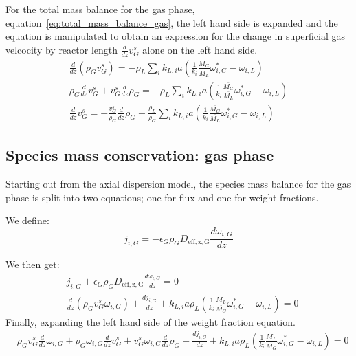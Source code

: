 \documentclass{article}
\begin{document}
For the total mass balance for the gas phase, equation~\ref{eq:total_mass_balance_gas}, the left hand side is expanded and the equation is manipulated to obtain an expression for the change in superficial gas velcocity by reactor length $\frac{d}{dz}v_G^s$ alone on the left hand side.
\begin{equation}
	\begin{split}
	\frac{d}{dz}\left(\rho_Gv_G^s\right) =-\rho_L\sum_ik_{L,i}a(\frac{1}{k_i}\frac{\overline{M_G}}{\overline{M_L}}\omega_{i,G}^*-\omega_{i,L})\\
	\rho_G\frac{d}{dz}v_G^s + v_G^s\frac{d}{dz}\rho_G =-\rho_L\sum_ik_{L,i}a(\frac{1}{k_i}\frac{\overline{M_G}}{\overline{M_L}}\omega_{i,G}^*-\omega_{i,L})\\
	\frac{d}{dz}v_G^s = -\frac{v_G^s}{\rho_G}\frac{d}{dz}\rho_G - \frac{\rho_L}{\rho_G}\sum_ik_{L,i}a(\frac{1}{k_i}\frac{\overline{M_G}}{\overline{M_L}}\omega_{i,G}^*-\omega_{i,L})
	\label{eq:total_balance_gas_manipulations}
	\end{split}
\end{equation}

\subsection{Species mass conservation: gas phase}
Starting out from the axial dispersion model, the species mass balance for the gas phase is split into two equations; one for flux and one for weight fractions.

We define:
\begin{equation}
	j_{i,G} = - \epsilon_G \rho_G D_{\mathrm{eff,z,G}}\frac{d\omega_{i,G}}{dz}
\end{equation}

We then get:
\begin{equation}
	\begin{split}
	& j_{i,G} + \epsilon_G \rho_G D_{\mathrm{eff,z,G}}\frac{d\omega_{i,G}}{dz} = 0\\
	&\frac{d}{dz}\left(\rho_G v_G^s \omega_{i,G} \right) + \frac{dj_{i,G}}{dz} + k_{L,i}a\rho_L(\frac{1}{k_i}\frac{\overline{M_L}}{\overline{M_G}}\omega_{i,G}^*-\omega_{i,L}) = 0
	\end{split}
\end{equation}
Finally, expanding the left hand side of the weight fraction equation.
	\begin{equation}
	\begin{split}
	&\rho_Gv_G^s\frac{d}{dz}\omega_{i,G} + \rho_G\omega_{i,G} \frac{d}{dz}v_G^s + v_G^s \omega_{i,G} \frac{d}{dz}\rho_G + \frac{dj_{i,G}}{dz} + k_{L,i}a\rho_L(\frac{1}{k_i}\frac{\overline{M_L}}{\overline{M_G}}\omega_{i,G}^*-\omega_{i,L}) = 0
	\end{split}
\end{equation}
\end{document}
